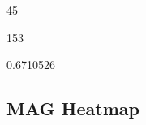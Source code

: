 \documentclass[
]{book}
\newenvironment{Shaded}{\begin{snugshade}}{\end{snugshade}}
\newcommand{\FunctionTok}[1]{\textcolor[rgb]{0.13,0.29,0.53}{\textbf{#1}}}
\newcommand{\NormalTok}[1]{#1}
\newcommand{\SpecialCharTok}[1]{\textcolor[rgb]{0.81,0.36,0.00}{\textbf{#1}}}
\newcommand{\StringTok}[1]{\textcolor[rgb]{0.31,0.60,0.02}{#1}}
\begin{document}
\begin{Shaded}
\begin{Highlighting}[]
\NormalTok{[1] 45}
\end{Highlighting}
\end{Shaded}

\begin{Shaded}
\end{Shaded}

\begin{Shaded}
\begin{Highlighting}[]
\NormalTok{[1] 153}
\end{Highlighting}
\end{Shaded}

\begin{Shaded}
\end{Shaded}

\begin{Shaded}
\begin{Highlighting}[]
\NormalTok{[1] 0.6710526}
\end{Highlighting}
\end{Shaded}

\subsection{MAG Heatmap}\label{mag-heatmap}
\end{document}

